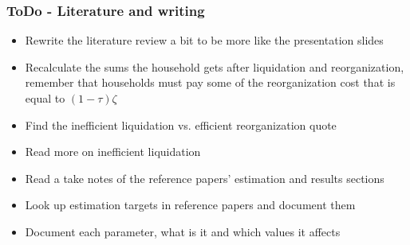 \documentclass[12pt]{article}
\begin{document}
\newpage

\subsubsection*{ToDo - Literature and writing}
\begin{itemize}\setlength\itemsep{0em} \small
    \item Rewrite the literature review a bit to be more like the presentation slides
    \item Recalculate the sums the household gets after liquidation and reorganization, remember that households must pay some of the reorganization cost that is equal to $(1-\tau)\zeta$
    \item Find the inefficient liquidation vs. efficient reorganization quote \checkmark 
    \item Read more on inefficient liquidation \checkmark
    \item Read a take notes of the reference papers' estimation and results sections \checkmark
    \item Look up estimation targets in reference papers and document them \checkmark
    \item Document each parameter, what is it and which values it affects \checkmark

\end{itemize} \normalsize
\end{document}
